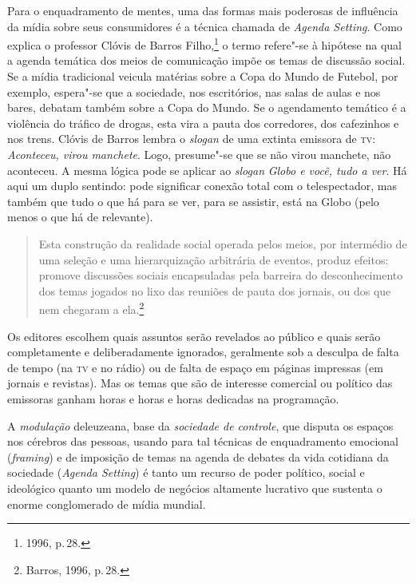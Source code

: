 Para o enquadramento de mentes, uma das formas mais poderosas de
influência da mídia sobre seus consumidores é a técnica chamada de
\emph{Agenda Setting}. Como explica o professor Clóvis de Barros Filho,\footnote{1996, p.\,28.} o termo refere"-se à hipótese na qual a agenda temática
dos meios de comunicação impõe os temas de discussão social. Se a mídia
tradicional veicula matérias sobre a Copa do Mundo de Futebol, por
exemplo, espera"-se que a sociedade, nos escritórios, nas salas de aulas
e nos bares, debatam também sobre a Copa do Mundo. Se o agendamento
temático é a violência do tráfico de drogas, esta vira a pauta dos
corredores, dos cafezinhos e nos trens. Clóvis de Barros lembra o
\emph{slogan} de uma extinta emissora de \textsc{tv}: \emph{Aconteceu, virou
manchete}. Logo, presume"-se que se não virou manchete, não aconteceu.
A mesma lógica pode se aplicar ao \emph{slogan} \emph{Globo e você,
tudo a ver}. Há aqui um duplo sentindo: pode significar conexão total
com o telespectador, mas também que tudo o que há para se ver, para se
assistir, está na Globo (pelo menos o que há de relevante).

\begin{quote}
Esta construção da realidade social operada pelos meios, por
intermédio de uma seleção e uma hierarquização arbitrária de eventos,
produz efeitos: promove discussões sociais encapsuladas pela barreira do
desconhecimento dos temas jogados no lixo das reuniões de pauta dos
jornais, ou dos que nem chegaram a ela.\footnote{Barros, 1996, p.\,28.}
\end{quote}

Os editores escolhem quais assuntos serão revelados ao público e quais
serão completamente e deliberadamente ignorados, geralmente sob a
desculpa de falta de tempo (na \textsc{tv} e no rádio) ou de falta de espaço em
páginas impressas (em jornais e revistas). Mas os temas que são de
interesse comercial ou político das emissoras ganham horas e horas e
horas dedicadas na programação.

A \emph{modulação} deleuzeana, base da \emph{sociedade de controle}, que
disputa os espaços nos cérebros das pessoas, usando para tal técnicas de
enquadramento emocional (\emph{framing}) e de imposição de temas na
agenda de debates da vida cotidiana da sociedade (\emph{Agenda Setting})
é tanto um recurso de poder político, social e ideológico quanto um
modelo de negócios altamente lucrativo que sustenta o enorme
conglomerado de mídia mundial.

